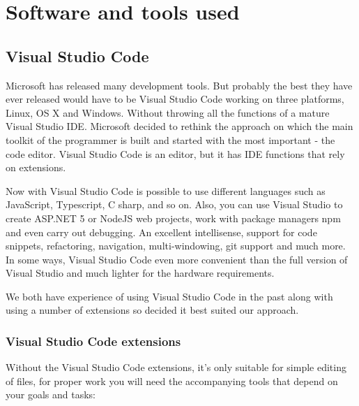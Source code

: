 \documentclass[12pt,a4paper,oneside,openany]{book}
\begin{document}
\section{Software and tools used}

\subsection{Visual Studio Code}
Microsoft has released many development tools. But probably the best they have ever released would have to be Visual Studio Code working on three platforms, Linux, OS X and Windows. Without throwing all the functions of a mature Visual Studio IDE. Microsoft decided to rethink the approach on which the main toolkit of the programmer is built and started with the most important - the code editor. Visual Studio Code is an editor, but it has IDE functions that rely on extensions. 

Now with Visual Studio Code is possible to use different languages such as JavaScript, Typescript, C sharp, and so on. Also, you can use Visual Studio to create ASP.NET 5 or NodeJS web projects, work with package managers npm and even carry out debugging. An excellent intellisense, support for code snippets, refactoring, navigation, multi-windowing, git support and much more. In some ways, Visual Studio Code even more convenient than the full version of Visual Studio and much lighter for the hardware requirements.

We both have experience of using Visual Studio Code in the past along with using a number of extensions so decided it best suited our approach.

\subsubsection{Visual Studio Code extensions}
Without the Visual Studio Code extensions, it's only suitable for simple editing of files, for proper work you will need the accompanying tools that depend on your goals and tasks:
\cite{vsDocs}
\end{document}
